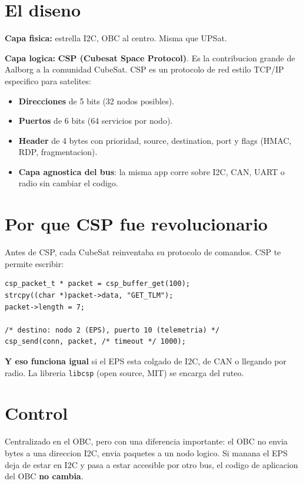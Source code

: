 \documentclass[11pt,a4paper,oneside,openright]{book}
\begin{document}
\section{El diseno}

\textbf{Capa fisica:} estrella I2C, OBC al centro. Misma que UPSat.

\textbf{Capa logica:} \textbf{CSP (Cubesat Space Protocol)}. Es la
contribucion grande de Aalborg a la comunidad CubeSat. CSP es un
protocolo de red estilo TCP/IP especifico para satelites:

\begin{itemize}[leftmargin=2em]
  \item \textbf{Direcciones} de 5 bits (32 nodos posibles).
  \item \textbf{Puertos} de 6 bits (64 servicios por nodo).
  \item \textbf{Header} de 4 bytes con prioridad, source, destination,
    port y flags (HMAC, RDP, fragmentacion).
  \item \textbf{Capa agnostica del bus}: la misma app corre sobre
    I2C, CAN, UART o radio sin cambiar el codigo.
\end{itemize}

\section{Por que CSP fue revolucionario}

Antes de CSP, cada CubeSat reinventaba su protocolo de comandos. CSP
te permite escribir:

\begin{lstlisting}[style=c, caption=Envio de comando a otro nodo via CSP]
csp_packet_t * packet = csp_buffer_get(100);
strcpy((char *)packet->data, "GET_TLM");
packet->length = 7;

/* destino: nodo 2 (EPS), puerto 10 (telemetria) */
csp_send(conn, packet, /* timeout */ 1000);
\end{lstlisting}

\textbf{Y eso funciona igual} si el EPS esta colgado de I2C, de CAN
o llegando por radio. La libreria \texttt{libcsp} (open source, MIT)
se encarga del ruteo.

\section{Control}

Centralizado en el OBC, pero con una diferencia importante: el OBC
no envia bytes a una direccion I2C, envia paquetes a un nodo logico.
Si manana el EPS deja de estar en I2C y pasa a estar accesible por
otro bus, el codigo de aplicacion del OBC \textbf{no cambia}.
\end{document}
